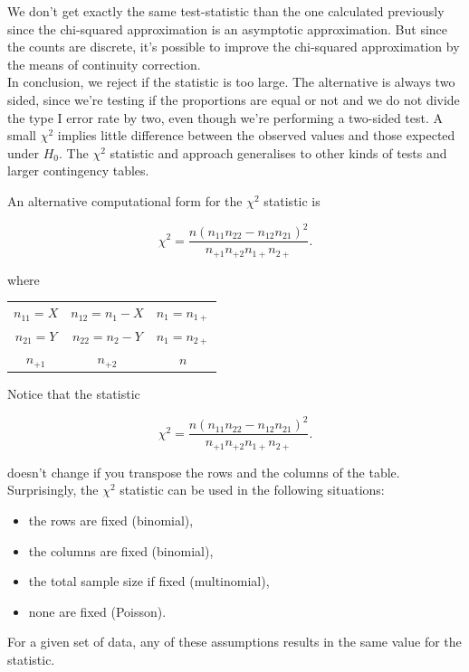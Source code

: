 \documentclass{homework}
\begin{document}
We don't get exactly the same test-statistic than the one calculated previously since the chi-squared approximation is an asymptotic approximation. But since the counts are discrete, it's possible to improve the chi-squared approximation by the means of continuity correction.\\

In conclusion, we reject if the statistic is too large. The alternative is always two sided, since we're testing if the proportions are equal or not and we do not divide the type I error rate by two, even though we're performing a two-sided test. A small $\chi^2$ implies little difference between the observed values and those expected under $H_0$. The $\chi^2$ statistic and approach generalises to other kinds of tests and larger contingency tables. 

An alternative computational form for the $\chi^2$ statistic is 

$$
\chi^2= \frac{n(n_{11}n_{22}-n_{12}n_{21})^2}{n_{+1}n_{+2}n_{1+}n_{2+}}.
$$

where 

\begin{center}
\begin{tabular}{ |c|c|c| } 
 \hline
 $n_{11} = X$ & $n_{12} = n_{1} - X$ & $n_1 = n_{1+}$ \\ 
 $n_{21} = Y$ & $n_{22} = n_{2} - Y$ & $n_1 = n_{2+}$ \\ 
 $n_{+1}$ & $n_{+2}$ & $n$ \\ 
 \hline
\end{tabular}
\end{center}

Notice that the statistic 

$$
\chi^2= \frac{n(n_{11}n_{22}-n_{12}n_{21})^2}{n_{+1}n_{+2}n_{1+}n_{2+}}.
$$

doesn't change if you transpose the rows and the columns of the table. Surprisingly, the $\chi^2$ statistic can be used in the following situations:

\begin{itemize}
    \item the rows are fixed (binomial),
    \item the columns are fixed (binomial),
    \item the total sample size if fixed (multinomial),
    \item none are fixed (Poisson).
\end{itemize}

For a given set of data, any of these assumptions results in the same value for the statistic. 
\end{document}
